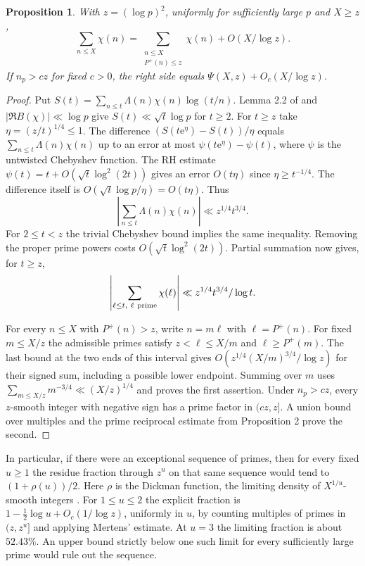 \documentclass[11pt]{article}
\newtheorem{proposition}{Proposition}
\newcommand{\e}{\mathrm e}
\begin{document}
\begin{proposition}
With $z=(\log p)^2$, uniformly for sufficiently large $p$ and $X\ge z$,
\[
 \sum_{n\le X}\chi(n)
 =\sum_{\substack{n\le X\\ P^+(n)\le z}}\chi(n)+O(X/\log z).
\]
If $n_p>cz$ for fixed $c>0$, the right side equals
$\Psi(X,z)+O_c(X/\log z)$.
\end{proposition}

\begin{proof}
Put $S(t)=\sum_{n\le t}\Lambda(n)\chi(n)\log(t/n)$.
Lemma 2.2 of \cite{lls} and $|\Re B(\chi)|\ll\log p$ give
$S(t)\ll\sqrt t\log p$ for $t\ge 2$. For $t\ge z$ take
$\eta=(z/t)^{1/4}\le1$. The difference
$(S(t\e^\eta)-S(t))/\eta$ equals
$\sum_{n\le t}\Lambda(n)\chi(n)$ up to an error at most
$\psi(t\e^\eta)-\psi(t)$, where $\psi$ is the untwisted Chebyshev
function. The RH estimate $\psi(t)=t+O(\sqrt t\log^2(2t))$ gives
an error $O(t\eta)$ since $\eta\ge t^{-1/4}$. The difference itself
is $O(\sqrt t\log p/\eta)=O(t\eta)$. Thus
\[
 \left|\sum_{n\le t}\Lambda(n)\chi(n)\right|\ll z^{1/4}t^{3/4}.
\]
For $2\le t<z$ the trivial Chebyshev bound implies the same inequality.
Removing the proper prime powers costs $O(\sqrt t\log^2(2t))$.
Partial summation now gives, for $t\ge z$,
\[
 \left|\sum_{\ell\le t,\ \ell\ {\rm prime}}\chi(\ell)\right|
 \ll z^{1/4}t^{3/4}/\log t .
\]

For every $n\le X$ with $P^+(n)>z$, write $n=m\ell$ with
$\ell=P^+(n)$. For fixed $m\le X/z$ the admissible primes satisfy
$z<\ell\le X/m$ and $\ell\ge P^+(m)$. The last bound at the two
ends of this interval gives $O(z^{1/4}(X/m)^{3/4}/\log z)$ for
their signed sum, including a possible lower endpoint. Summing over
$m$ uses $\sum_{m\le X/z}m^{-3/4}\ll(X/z)^{1/4}$ and proves the
first assertion. Under $n_p>cz$, every $z$-smooth integer with negative
sign has a prime factor in $(cz,z]$. A union bound over multiples and
the prime reciprocal estimate from Proposition 2 prove the second.
\end{proof}

In particular, if there were an exceptional sequence of primes, then
for every fixed $u\ge1$ the residue fraction through $z^u$ on that
same sequence would tend to $(1+\rho(u))/2$. Here $\rho$ is the
Dickman function, the limiting density of $X^{1/u}$-smooth integers
\cite[Introduction]{gs}. For $1\le u\le2$ the explicit fraction is
$1-\tfrac12\log u+O_c(1/\log z)$, uniformly in $u$, by counting
multiples of primes in $(z,z^u]$ and applying Mertens' estimate.
At $u=3$ the limiting fraction is about $52.43\%$. An upper bound
strictly below one such limit for every sufficiently large prime
would rule out the sequence.
\end{document}
